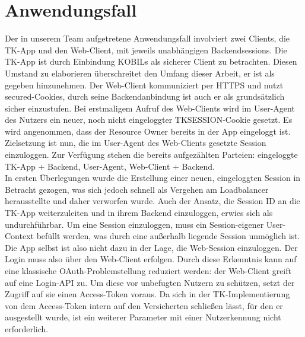 \chapter{Anwendungsfall}\label{Anwendungsfall} Der in unserem Team
aufgetretene Anwendungsfall involviert zwei Clients, die TK-App und den
Web-Client, mit jeweils unabhängigen Backendsessions. Die TK-App ist durch
Einbindung KOBILs als sicherer Client zu betrachten. Diesen Umstand zu
elaborieren überschreitet den Umfang dieser Arbeit, er ist als gegeben
hinzunehmen. Der Web-Client kommuniziert per HTTPS und nutzt secured-Cookies,
durch seine Backendanbindung ist auch er als grundsätzlich sicher einzustufen.
Bei erstmaligem Aufruf des Web-Clients wird im User-Agent des Nutzers ein neuer,
noch nicht eingeloggter TKSESSION-Cookie gesetzt. Es wird angenommen, dass der
Resource Owner bereits in der App eingeloggt ist. Zielsetzung ist nun, die im
User-Agent des Web-Clients gesetzte Session einzuloggen. Zur Verfügung stehen
die bereits aufgezählten Parteien: eingeloggte TK-App + Backend, User-Agent,
Web-Client + Backend.
\\
In ersten Überlegungen wurde die Erstellung einer neuen, eingeloggten Session
in Betracht gezogen, was sich jedoch schnell als Vergehen am Loadbalancer
herausstellte und daher verworfen wurde. Auch der Ansatz, die Session ID an die
TK-App weiterzuleiten und in ihrem Backend einzuloggen, erwies sich als
undurchführbar. Um eine Session einzuloggen, muss ein Session-eigener
User-Context befüllt werden, was durch eine außerhalb liegende Session unmöglich
ist.
\\
Die App selbst ist also nicht dazu in der Lage, die Web-Session einzuloggen.
Der Login muss also über den Web-Client erfolgen. Durch diese Erkenntnis kann
auf eine klassische \gls{OAuth}-Problemstellung reduziert werden: der Web-Client
greift auf eine Login-API zu. Um diese vor unbefugten Nutzern zu schützen, setzt
der Zugriff auf sie einen Access-Token voraus. Da sich in der TK-Implementierung
von dem Access-Token intern auf den Versicherten schließen lässt, für den er
ausgestellt wurde, ist ein weiterer Parameter mit einer Nutzerkennung nicht
erforderlich.

